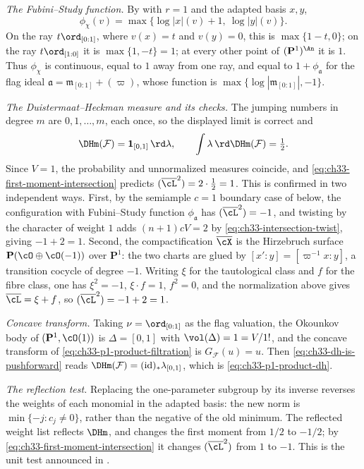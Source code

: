 \begin{example}
\emph{The Fubini--Study function.}  By  with
$r=1$ and the adapted basis $x,y$,
\begin{equation}
\label{eq:ch33-p1-product-fs}
 \phi_\chi(v)=\max\{\log|x|(v)+1,\ \log|y|(v)\}.
\end{equation}
On the ray $t\ord_{[0:1]}$, where $v(x)=t$ and $v(y)=0$, this is
$\max\{1-t,0\}$; on the ray $t\ord_{[1:0]}$ it is
$\max\{1,-t\}=1$; at every other point of $(\mathbf P^1)^{\An}$ it is
$1$.  Thus $\phi_\chi$ is continuous, equal to $1$ away from one ray,
and equal to $1+\phi_{\mathfrak a}$ for the flag ideal
$\mathfrak a=\mathfrak m_{[0:1]}+(\varpi)$, whose function is
$\max\{\log|\mathfrak m_{[0:1]}|,-1\}$.

\emph{The Duistermaat--Heckman measure and its checks.}  The jumping numbers
in degree $m$ are $0,1,\dots,m$, each once, so the displayed limit is
correct and
\begin{equation}
\label{eq:ch33-p1-product-dh}
 \DHm(\mathcal F)=\mathbf 1_{[0,1]}\,\rd\lambda,
 \qquad
 \int\lambda\,\rd\DHm(\mathcal F)=\tfrac12 .
\end{equation}
Since $V=1$, the probability and unnormalized measures coincide, and
\eqref{eq:ch33-first-moment-intersection} predicts
$(\overline\cL^{2})=2\cdot\tfrac12=1$.  This is confirmed in two
independent ways.  First, by the semiample $c=1$ boundary case of
 below, the configuration
with Fubini--Study function $\phi_{\mathfrak a}$ has
$(\overline\cL^2)=-1$, and twisting by the character of weight $1$ adds
$(n+1)cV=2$ by \eqref{eq:ch33-intersection-twist}, giving $-1+2=1$.
Second, the compactification $\overline\cX$ is the Hirzebruch surface
$\mathbf P(\cO\oplus\cO(-1))$ over $\mathbf P^1$: the two charts are
glued by $[x':y]=[\varpi^{-1}x:y]$, a transition cocycle of degree
$-1$.  Writing $\xi$ for the tautological class and $f$ for the fibre
class, one has $\xi^2=-1$, $\xi\cdot f=1$, $f^2=0$, and the
normalization above gives $\overline\cL=\xi+f$, so
$(\overline\cL^2)=-1+2=1$.

\emph{Concave transform.}  Taking $\nu=\ord_{[0:1]}$ as the flag
valuation, the Okounkov body of $(\mathbf P^1,\cO(1))$ is
$\Delta=[0,1]$ with $\vol(\Delta)=1=V/1!$, and the concave transform of
\eqref{eq:ch33-p1-product-filtration} is
$G_{\mathcal F}(u)=u$.  Then
\eqref{eq:ch33-dh-is-pushforward} reads
$\DHm(\mathcal F)=(\operatorname{id})_\ast\lambda_{[0,1]}$, which is
\eqref{eq:ch33-p1-product-dh}.

\emph{The reflection test.}  Replacing the one-parameter subgroup by its
inverse reverses the weights of each monomial in the adapted basis:
the new norm is $\min\{-j:c_j\ne0\}$, rather than the negative of
the old minimum.  The reflected weight list reflects
$\DHm$, and changes the first moment from $1/2$ to $-1/2$; by
\eqref{eq:ch33-first-moment-intersection} it changes
$(\overline\cL^2)$ from $1$ to $-1$.  This is the unit test announced
in .
\end{example}

